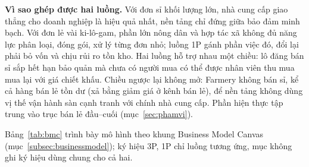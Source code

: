 \noindent\textbf{Vì sao ghép được hai luồng.} Với đơn sỉ khối lượng lớn, nhà cung cấp giao thẳng cho doanh nghiệp là hiệu quả nhất, nền tảng chỉ đứng giữa bảo đảm minh bạch. Với đơn lẻ vài ki-lô-gam, phần lớn nông dân và hợp tác xã không đủ năng lực phân loại, đóng gói, xử lý từng đơn nhỏ; luồng 1P gánh phần việc đó, đổi lại phải bỏ vốn và chịu rủi ro tồn kho. Hai luồng hỗ trợ nhau một chiều: lô đăng bán sỉ sắp hết hạn bảo quản mà chưa có người mua có thể được nhân viên thu mua mua lại với giá chiết khấu. Chiều ngược lại không mở: Farmery không bán sỉ, kể cả hàng bán lẻ tồn dư (xả bằng giảm giá ở kênh bán lẻ), để nền tảng không dùng vị thế vận hành sàn cạnh tranh với chính nhà cung cấp. Phần hiện thực tập trung vào trục bán lẻ đầu--cuối (mục~\ref{sec:phamvi}).

Bảng~\ref{tab:bmc} trình bày mô hình theo khung Business Model Canvas (mục~\ref{subsec:businessmodel}); ký hiệu 3P, 1P chỉ luồng tương ứng, mục không ghi ký hiệu dùng chung cho cả hai.

